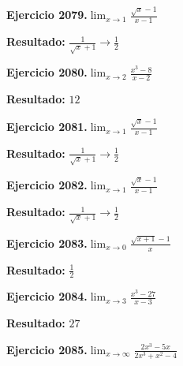 \documentclass[10pt,a4paper]{article}
\begin{document}
\begin{ejbox}
\textbf{Ejercicio 2079.}\quad $\lim_{x\to 1} \frac{\sqrt{x}-1}{x-1}$
\end{ejbox}

\begin{solbox}
\textbf{Resultado:} \(\displaystyle \frac{1}{\sqrt{x}+1} \to \frac{1}{2}\)
\end{solbox}

\begin{ejbox}
\textbf{Ejercicio 2080.}\quad $\lim_{x\to 2} \frac{x^3-8}{x-2}$
\end{ejbox}

\begin{solbox}
\textbf{Resultado:} \(\displaystyle 12\)
\end{solbox}

\newpage
\begin{ejbox}
\textbf{Ejercicio 2081.}\quad $\lim_{x\to 1} \frac{\sqrt{x}-1}{x-1}$
\end{ejbox}

\begin{solbox}
\textbf{Resultado:} \(\displaystyle \frac{1}{\sqrt{x}+1} \to \frac{1}{2}\)
\end{solbox}

\begin{ejbox}
\textbf{Ejercicio 2082.}\quad $\lim_{x\to 1} \frac{\sqrt{x}-1}{x-1}$
\end{ejbox}

\begin{solbox}
\textbf{Resultado:} \(\displaystyle \frac{1}{\sqrt{x}+1} \to \frac{1}{2}\)
\end{solbox}

\begin{ejbox}
\textbf{Ejercicio 2083.}\quad $\lim_{x\to 0} \frac{\sqrt{x+1}-1}{x}$
\end{ejbox}

\begin{solbox}
\textbf{Resultado:} \(\displaystyle \frac{1}{2}\)
\end{solbox}

\newpage
\begin{ejbox}
\textbf{Ejercicio 2084.}\quad $\lim_{x\to 3} \frac{x^3-27}{x-3}$
\end{ejbox}

\begin{solbox}
\textbf{Resultado:} \(\displaystyle 27\)
\end{solbox}

\begin{ejbox}
\textbf{Ejercicio 2085.}\quad $\lim_{x\to \infty} \frac{2x^3 - 5x}{2x^3 + x^2 - 4}$
\end{ejbox}
\end{document}
